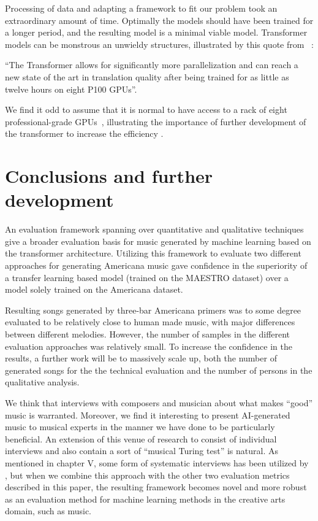 \documentclass{IEEEtran}
\begin{document}
Processing of data and adapting a framework to fit our problem 
took an extraordinary amount of time. Optimally the models should have been
trained for a longer period, and the resulting model is a minimal viable model.
Transformer models can be monstrous 
an unwieldy structures, illustrated by this quote from
\citeauthor{vaswani2017attention}~\cite{vaswani2017attention}:
\begin{displayquote}
 ``The Transformer allows for significantly
more parallelization and can reach a new state of the art in translation
quality after being trained for as little as twelve hours on eight P100 GPUs''.
\end{displayquote}
We find it odd to assume that it is normal to have access to a rack of eight 
professional-grade GPUs~\cite{vaswani2017attention}, illustrating the importance
of further development of the transformer to increase the efficiency 
\cite{kitaev2020reformer}.

\section{Conclusions and further development}

An evaluation framework spanning over quantitative and qualitative techniques
give a broader evaluation basis for music generated by machine learning 
based on the transformer architecture. Utilizing this framework to evaluate two different 
approaches for generating Americana music gave confidence in the superiority of a 
transfer learning based model (trained on the MAESTRO dataset) over a model solely
trained on the Americana dataset.

Resulting songs generated by three-bar Americana primers was to some degree evaluated to 
be relatively close to human made music, with major differences between different melodies.
However, the number of samples in the different evaluation approaches was relatively small. 
To increase the confidence in the results, a further work will be to massively scale up, both the 
number of generated songs for the the technical evaluation and the number of persons in the 
qualitative analysis.

We think that interviews with composers and musician about what makes ``good'' music 
is warranted. Moreover, we find it interesting to present AI-generated 
music to musical experts in the manner we have done to be particularly beneficial. 
An extension of this venue of research to consist of individual interviews
and also contain a sort of ``musical Turing test'' is natural. As mentioned in 
chapter V, some form of systematic interviews has been utilized by \citeauthor{sturm2017taking} 
\cite{sturm2017taking}, but when we combine this approach with the other two evaluation
metrics described in this paper, the resulting framework becomes novel and more robust as an
evaluation method for machine learning methods in the creative arts domain, such as music.
\end{document}
